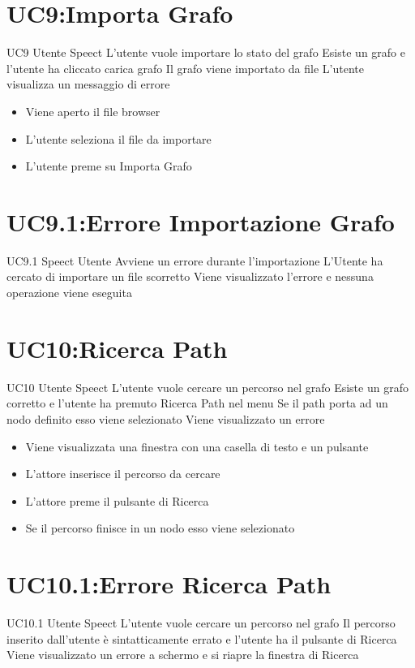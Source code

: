 \documentclass[../AnalisideiRequisiti.tex]{subfiles}
\begin{document}
\section{UC9:Importa Grafo}
\UserCase
{UC9}
{Utente}
{Speect}
{L'utente vuole importare lo stato del grafo}
{Esiste un grafo e l'utente ha cliccato carica grafo}
{Il grafo viene importato da file}
{L'utente visualizza un messaggio di errore }
{
	{\begin{itemize}
			\item{} Viene aperto il file browser
			\item{} L'utente seleziona il file da importare
			\item{} L'utente preme su Importa Grafo
\end{itemize}}}
\section{UC9.1:Errore Importazione Grafo}
\UserCase
{UC9.1}
{Speect}
{Utente}
{Avviene un errore durante l'importazione}
{L'Utente ha cercato di importare un file scorretto}
{Viene visualizzato l'errore e nessuna operazione viene eseguita}
{}
{}


\section{UC10:Ricerca Path}
\UserCase
{UC10}
{Utente}
{Speect}
{L'utente vuole cercare un percorso nel grafo}
{Esiste un grafo corretto e l'utente ha premuto Ricerca Path nel menu}
{Se il path porta ad un nodo definito esso viene selezionato }
{Viene visualizzato un errore }
{
	\begin{itemize}
		\item{} Viene visualizzata una finestra con una casella di testo e un pulsante
		\item{} L'attore inserisce il percorso da cercare
		\item{} L'attore preme il pulsante di Ricerca
		\item{} Se il percorso finisce in un nodo esso viene selezionato 
 	\end{itemize}
}

\section{UC10.1:Errore Ricerca Path}
\UserCase
{UC10.1}
{Utente}
{Speect}
{L'utente vuole cercare un percorso nel grafo}
{Il percorso inserito dall'utente è sintatticamente errato e l'utente ha il pulsante di Ricerca}
{Viene visualizzato un errore a schermo e si riapre la finestra di Ricerca }
{}
{}
\end{document}
